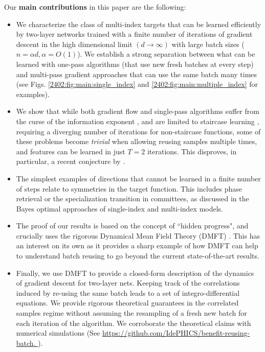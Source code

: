 Our \textbf{main contributions} in this paper are the following: 

\begin{itemize}
    \item We characterize the class of multi-index targets that can be learned efficiently by two-layer networks trained with a finite number of iterations of gradient descent in the high dimensional limit $(d \to \infty)$ with large batch sizes ($n = \alpha d, \alpha = O(1)$). We establish a strong separation between what can be learned with one-pass algorithms (that use new fresh batches at every step) and multi-pass gradient approaches that can 
    use the same batch many times (see Figs.     \ref{2402:fig:main:single_index} and \ref{2402:fig:main:multiple_index} for examples).
    \item We show that while both gradient flow \citep{bietti2023learning} and single-pass
    algorithms suffer from the curse of the information exponent \citep{arous2021online}, and are limited to staircase learning \citep{abbe2023sgd}, requiring a diverging number of iterations for non-staircase functions, some of these problems become {\it trivial} when allowing reusing samples multiple times, and features can be learned in just $T=2$ iterations. This disproves, in particular, a recent conjecture by \citep{abbe2023sgd}.
    \item The simplest examples of directions that cannot be learned in a finite number of steps relate to symmetries in the target function. This includes phase retrieval \citep{maillard2020phase} or the specialization transition in committees, as discussed in the Bayes optimal approaches of single-index \citep{barbier2019optimal} and multi-index \citep{aubin2019committee} models.  
    \item The proof of our results is based on the concept of ``hidden progress", and crucially uses the rigorous Dynamical Mean Field Theory (DMFT) \citep{celentano2021high,gerbelot2022rigorous}. This has an interest on its own as it provides a sharp example of how DMFT can help to understand batch reusing to go beyond the current state-of-the-art results.
    \item Finally, we use DMFT to provide a closed-form description of the dynamics of gradient descent for two-layer nets. Keeping track of the correlations induced by re-using the same batch leads to a set of integro-differential equations.  We provide rigorous theoretical guarantees in the correlated samples regime without assuming the resampling of a fresh new batch for each iteration of the algorithm. We corroborate the theoretical claims with numerical simulations (See  \href{https://github.com/IdePHICS/benefit-reusing-batch}{\href{https://github.com/IdePHICS/benefit-reusing-batch}{https://github.com/IdePHICS/benefit-reusing-batch}.
}).  
\end{itemize}




